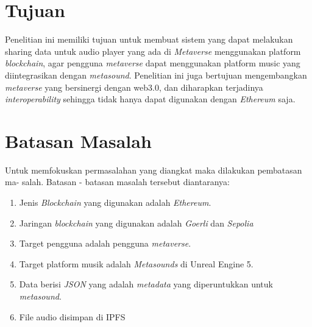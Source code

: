 \section{Tujuan}
\label{sec:Tujuan}

Penelitian ini memiliki tujuan untuk membuat sistem yang
dapat melakukan sharing data untuk audio player yang ada
di \emph{Metaverse} menggunakan platform \emph{blockchain}, agar
pengguna \emph{metaverse} dapat menggunakan platform music
yang diintegrasikan dengan \emph{metasound}. Penelitian ini juga bertujuan mengembangkan \emph{metaverse} yang
bersinergi dengan web3.0, dan diharapkan terjadinya \emph{interoperability} sehingga tidak hanya dapat digunakan
dengan \emph{Ethereum} saja.

\section{Batasan Masalah}
\label{sec:batasanmasalah}

Untuk memfokuskan permasalahan yang diangkat maka dilakukan pembatasan ma-
salah. Batasan - batasan masalah tersebut diantaranya:
\begin{enumerate}
  \item Jenis \emph{Blockchain} yang digunakan adalah \emph{Ethereum}.
  \item Jaringan \emph{blockchain} yang digunakan adalah \emph{Goerli} dan \emph{Sepolia}
  \item Target pengguna adalah pengguna \emph{metaverse}.
  \item Target platform musik adalah \emph{Metasounds} di Unreal Engine 5.
  \item Data berisi \emph{JSON} yang adalah \emph{metadata} yang diperuntukkan untuk \emph{metasound}.
  \item File audio disimpan di IPFS
\end{enumerate}
